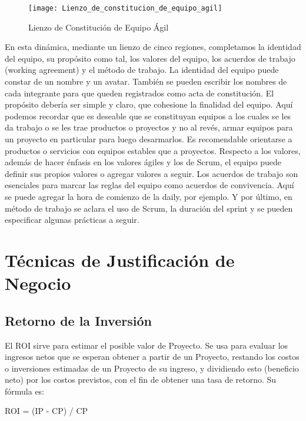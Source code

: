 \begin{figure}[h]
  \centering
  \texttt{[image: Lienzo\_de\_constitucion\_de\_equipo\_agil]}
  \caption{Lienzo de Constitución de Equipo Ágil}
  \centering
  \label{fig:Lienzo_de_constitucion_de_equipo_agil} %
\end{figure}

En esta dinámica, mediante un lienzo de cinco regiones, completamos la identidad del equipo, su propósito como tal, los valores del equipo, los acuerdos de trabajo (working agreement) y el método de trabajo. La identidad del equipo puede constar de un nombre y un avatar. También se pueden escribir los nombres de cada integrante para que queden registrados como acta de constitución. El propósito debería ser simple y claro, que cohesione la finalidad del equipo. Aquí podemos recordar que es deseable que se constituyan equipos a los cuales se les da trabajo o se les trae productos o proyectos y no al revés, armar equipos para un proyecto en particular para luego desarmarlos. Es recomendable orientarse a productos o servicios con equipos estables que a proyectos. Respecto a los valores, además de hacer énfasis en los valores ágiles y los de Scrum, el equipo puede definir sus propios valores o agregar valores a seguir. Los acuerdos de trabajo son esenciales para marcar las reglas del equipo como acuerdos de convivencia. Aquí se puede agregar la hora de comienzo de la daily, por ejemplo. Y por último, en método de trabajo se aclara el uso de Scrum, la duración del sprint y se pueden especificar algunas prácticas a seguir.

\newpage
\section{Técnicas de Justificación de Negocio}

\subsection{Retorno de la Inversión}

El ROI sirve para estimar el posible valor de Proyecto. Se usa para evaluar los ingresos netos que se esperan obtener a partir de un Proyecto, restando los costos o inversiones estimadas de un Proyecto de su ingreso, y dividiendo esto (beneficio neto) por los costos previstos, con el fin de obtener una tasa de retorno. Su fórmula es:

ROI = (IP - CP) / CP

